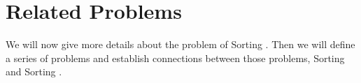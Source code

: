 \chapter{Related Problems}

We will now give more details about the problem of Sorting \XY. Then we will
define a series of problems and establish connections between those problems,
Sorting and Sorting \XY.
